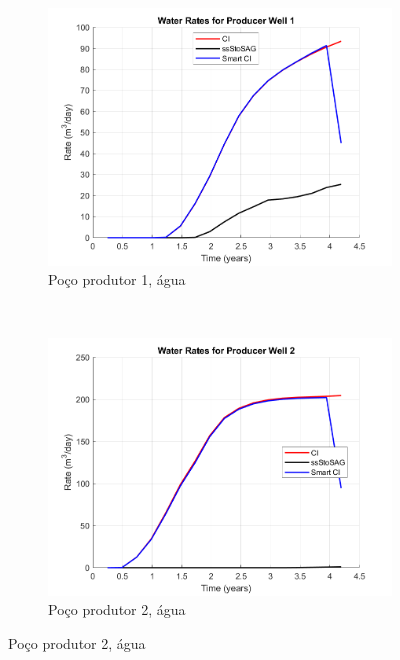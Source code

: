 \begin{figure}[!ht]
	\centering
	\begin{subfigure}[b]{.45\textwidth}
		\includegraphics[width=\textwidth]{figs/resultadosEgg/imgsim2/EGG_WaterWell1_Zoom}
		\caption{Po\c{c}o produtor 1, \'{a}gua}
		\label{EGG2_WaterWell1}
	\end{subfigure}
	~
	\begin{subfigure}[b]{.45\textwidth}
		\includegraphics[width=\textwidth]{figs/resultadosEgg/imgsim2/EGG_WaterWell2_Zoom}
		\caption{Po\c{c}o produtor 2, \'{a}gua}
		\label{EGG2_WaterWell2}
	\end{subfigure}
	

\end{figure}
